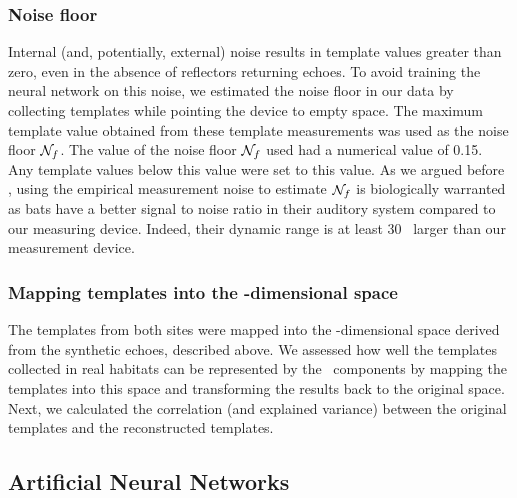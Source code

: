 \documentclass[preprint,5p]{elsarticle}
\begin{document}
\subsubsection{Noise floor}

Internal (and, potentially, external) noise results in template values greater than zero, even in the absence of reflectors returning echoes. To avoid training the neural network on this noise, we estimated the noise floor in our data by collecting templates while pointing the device to empty space. The maximum template value obtained from these template measurements was used as the noise floor $\mathcal{N}_f$. The value of the noise floor $\mathcal{N}_f$ used had a numerical value of 0.15. Any template values below this value were set to this value. As we argued before \citep{Vanderelst2016}, using the empirical measurement noise to estimate $\mathcal{N}_f$ is biologically warranted as bats have a better signal to noise ratio in their auditory system compared to our measuring device. Indeed, their dynamic range is at least 30 \db\ larger than our measurement device.

\subsubsection{Mapping templates into the \pca-dimensional space}

The templates from both sites were mapped into the \pca-dimensional space derived from the synthetic echoes, described above. We assessed how well the templates collected in real habitats can be represented by the \pca\ components by mapping the templates into this space and transforming the results back to the original space. Next, we calculated the correlation (and explained variance) between the original templates and the reconstructed templates.

\subsection{Artificial Neural Networks}
\end{document}
